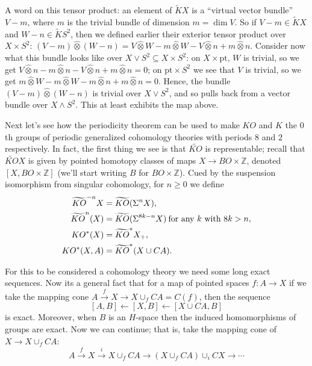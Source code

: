 \documentclass{article}
\newcommand{\Z}{\mathbb{Z}}
\newcommand{\sprod}{\wedge}
\newcommand{\wsum}{\vee}
\newcommand{\ptspace}{\mathrm{pt}}
\newcommand{\Suspend}{\Sigma}
\newcommand{\from}{\leftarrow}
\begin{document}
A word on this tensor product: an element of $\tilde K X$ is a ``virtual vector bundle'' $V - m$, where $m$ is the trivial bundle of dimension $m = \dim V$.  So if $V - m \in \tilde KX$ and $W - n \in \tilde KS^2$, then we defined earlier their exterior tensor product over $X \times S^2$: $(V - m)\hat\otimes(W - n) = V \hat\otimes W - m \hat\otimes W - V \hat\otimes n + m \hat\otimes n$.  Consider now what this bundle looks like over $X \vee S^2 \subseteq X \times S^2$: on $X \times \ptspace$, $W$ is trivial, so we get $V \hat\otimes n - m \hat\otimes n - V \hat\otimes n + m \hat\otimes n = 0$; on $\ptspace \times S^2$ we see that $V$ is trivial, so we get $m \hat\otimes W - m \hat\otimes W - m \hat\otimes n + m \hat\otimes n = 0$.  Hence, the bundle $(V - m) \hat\otimes (W - n)$ is trivial over $X \wsum S^2$, and so pulls back from a vector bundle over $X \sprod S^2$.  This at least exhibits the map above.

Next let's see how the periodicity theorem can be used to make $KO$ and $K$ the $0$th groups of periodic generalized cohomology theories with periods $8$ and $2$ respectively.  In fact, the first thing we see is that $\widetilde{KO}$ is representable; recall that $\widetilde{KO} X$ is given by pointed homotopy classes of maps $X \to BO \times \Z$, denoted $[X, BO \times \Z]$ (we'll start writing $B$ for $BO \times \Z$).  Cued by the suspension isomorphism from singular cohomology, for $n \ge 0$ we define
\begin{align*}
\widetilde{KO}^{-n} X & = \widetilde{KO}(\Suspend^n X), \\
\widetilde{KO}^n(X) & = \widetilde{KO}(\Suspend^{8k-n}X) \hbox{\:for any $k$ with $8k > n$}, \\
KO^*(X) &= \widetilde{KO}^* X_+, \\
KO^*(X, A) & = \widetilde{KO}^*(X \cup CA).
\end{align*}

For this to be considered a cohomology theory we need some long exact sequences.  Now its a general fact that for a map of pointed spaces $f: A \to X$ if we take the mapping cone $A \stackrel{f}{\to} X \to X \cup_f CA = C(f)$, then the sequence
\[
[A, B] \from [X, B] \from [X \cup CA, B]
\]
is exact.  Moreover, when $B$ is an $H$-space then the induced homomorphisms of groups are exact.  Now we can continue; that is, take the mapping cone of $X \to X \cup_f CA$:
\[
A \stackrel{f}{\to} X \stackrel{i}{\to} X \cup_f CA \to (X \cup_f CA) \cup_i CX \to \cdots
\]
\end{document}

